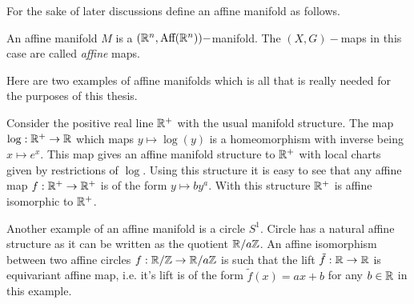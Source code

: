For the sake of later discussions define an affine manifold as follows.
\begin{definition}
  An affine manifold $M$ is a $(\mathbb{R}^n, \text{Aff}(\mathbb{R}^n))-$manifold. The $(X,G)-$maps in this case are called \textit{affine} maps.
\end{definition}
Here are two examples of affine manifolds which is all that is really needed for the purposes of this thesis.
\begin{exmp}
  Consider the positive real line $\mathbb{R}^+$ with the usual manifold structure. The map $\log:\mathbb{R}^+\to \mathbb{R}$ which maps $y\mapsto \log(y)$ is a homeomorphism with inverse being $x\mapsto e^x$. This map gives an affine manifold structure to $\mathbb{R}^+$ with local charts given by restrictions of $\log$. Using this structure it is easy to see that any affine map $f:\mathbb{R}^+\to \mathbb{R}^+$ is of the form $y\mapsto by^a$. With this structure $\mathbb{R}^+$ is affine isomorphic to $\mathbb{R}^+$.
\end{exmp}
\begin{exmp}
  Another example of an affine manifold is a circle $S^1$. Circle has a natural affine structure as it can be written as the quotient $\mathbb{R}/a\mathbb{Z}$. An affine isomorphism between two affine circles $f:\mathbb{R}/\mathbb{Z}\to \mathbb{R}/a\mathbb{Z}$ is such that the lift $\tilde{f}:\mathbb{R}\to \mathbb{R}$ is equivariant affine map, i.e. it's lift is of the form $\tilde{f}(x) = ax+b$ for any $b\in \mathbb{R}$ in this example. 
\end{exmp}
